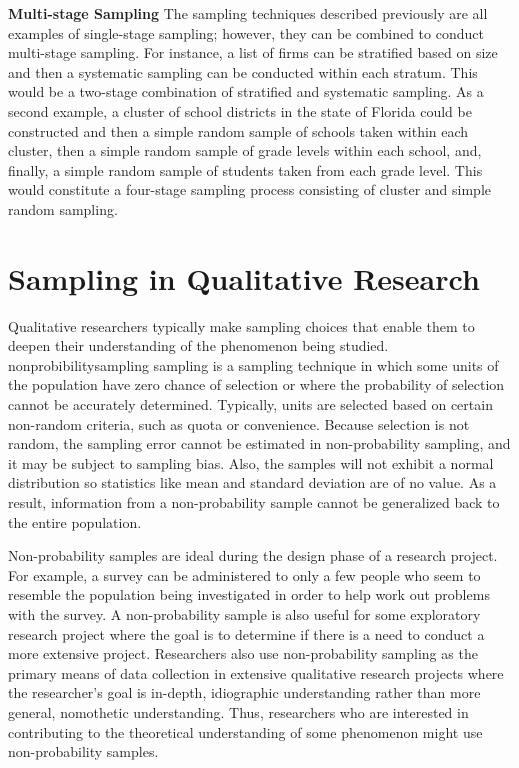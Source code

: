 \textbf{Multi-stage Sampling} The sampling techniques described previously are all examples of single-stage sampling; however, they can be combined to conduct multi-stage sampling. For instance, a list of firms can be stratified based on size and then a systematic sampling can be conducted within each stratum. This would be a two-stage combination of stratified and systematic sampling. As a second example, a cluster of school districts in the state of Florida could be constructed and then a simple random sample of schools taken within each cluster, then a simple random sample of grade levels within each school, and, finally, a simple random sample of students taken from each grade level. This would constitute a four-stage sampling process consisting of cluster and simple random sampling.

\section{Sampling in Qualitative Research}

Qualitative researchers typically make sampling choices that enable them to deepen their understanding of the phenomenon being studied. \Gls{nonprobibilitysampling} sampling is a sampling technique in which some units of the population have zero chance of selection or where the probability of selection cannot be accurately determined. Typically, units are selected based on certain non-random criteria, such as quota or convenience. Because selection is not random, the sampling error cannot be estimated in non-probability sampling, and it may be subject to sampling bias. Also, the samples will not exhibit a normal distribution so statistics like mean and standard deviation are of no value. As a result, information from a non-probability sample cannot be generalized back to the entire population. 

Non-probability samples are ideal during the design phase of a research project. For example, a survey can be administered to only a few people who seem to resemble the population being investigated in order to help work out problems with the survey. A non-probability sample is also useful for some exploratory research project where the goal is to determine if there is a need to conduct a more extensive project. Researchers also use non-probability sampling as the primary means of data collection in extensive qualitative research projects where the researcher's goal is in-depth, \gls{idiographic} understanding rather than more general, \gls{nomothetic} understanding. Thus, researchers who are interested in contributing to the theoretical understanding of some phenomenon might use non-probability samples. 

